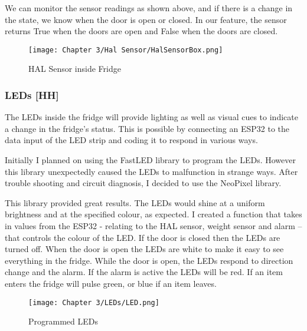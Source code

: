 We can monitor the sensor readings as shown above, and if there is a change in the state, we know when the door is open or closed.
In our feature, the sensor returns True when the doors are open and False when the doors are closed.

\begin{figure}[H]        
    \centering
    \texttt{[image: Chapter 3/Hal Sensor/HalSensorBox.png]}
    \caption{HAL Sensor inside Fridge}
    \label{fig:haldoor}
\end{figure} 

\subsubsection{LEDs [HH]}

The LEDs inside the fridge will provide lighting as well as visual cues to indicate a change in the fridge's status.
This is possible by connecting an ESP32 to the data input of the LED strip and coding it to respond in various ways.

Initially I planned on using the FastLED library to program the LEDs.
However this library unexpectedly caused the LEDs to malfunction in strange ways.
After trouble shooting and circuit diagnosis, I decided to use the NeoPixel library.

This library provided great results.
The LEDs would shine at a uniform brightness and at the specified colour, as expected.
I created a function that takes in values from the ESP32 - relating to the HAL sensor, weight sensor and alarm – that controls the colour of the LED.
If the door is closed then the LEDs are turned off.
When the door is open the LEDs are white to make it easy to see everything in the fridge.
While the door is open, the LEDs respond to direction change and the alarm.
If the alarm is active the LEDs will be red.
If an item enters the fridge will pulse green, or blue if an item leaves.

\begin{figure}[H]        
    \centering
    \texttt{[image: Chapter 3/LEDs/LED.png]}
    \caption{Programmed LEDs}
\end{figure} 